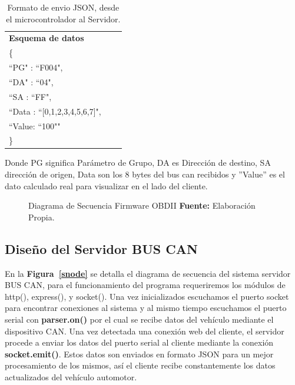\begin{table}[H]
\begin{center}
\begin{tabular}{l c c  }
\toprule
\textbf{Esquema de datos}  & &   \\ 

\{            &  &    \\   
  ``PG" : ``F004",  &  &  \\
  ``DA" :  ``04",   &  &   \\  
  ``SA : ``FF",    &  &   \\  
  ``Data : ``[0,1,2,3,4,5,6,7]", & &  \\  
  ``Value: ``100""  &  &  \\    
  \}          &  & \\ \bottomrule
\end{tabular}
\caption{Formato de envio JSON, desde el microcontrolador al Servidor.}
\label{tabla:json}
\end{center}
\end{table}

Donde PG significa Parámetro de Grupo, DA es Dirección de destino, SA dirección de origen, Data son los 8 bytes del bus can recibidos y ''Value'' es el dato calculado real para visualizar en el lado del cliente.






\begin{figure}[t]
	\centering
	\begin{center}
		
	\end{center}
	\caption[Diagrama de Secuencia Firmware OBDII.]{Diagrama de Secuencia Firmware OBDII \textbf{ Fuente:} Elaboración Propia.}
	\label{sj} %
\end{figure}


\subsection{Diseño del Servidor BUS CAN}
En la \textbf{Figura~\ref{snode}} se detalla el diagrama de secuencia del sistema servidor BUS CAN, para el funcionamiento del programa requeriremos los módulos de http(), express(), y socket(). Una vez inicializados escuchamos el puerto socket para encontrar conexiones al sistema y al mismo tiempo escuchamos el puerto serial con {\bfseries parser.on()} por el cual se recibe datos del vehículo mediante el dispositivo CAN. 
Una vez detectada una conexión web del cliente,  el servidor  procede a enviar los datos del puerto serial al cliente mediante la conexión  {\bfseries socket.emit()}. Estos datos son enviados en formato JSON para un mejor procesamiento de los mismos,  así el cliente recibe constantemente los datos actualizados del vehículo automotor. 

